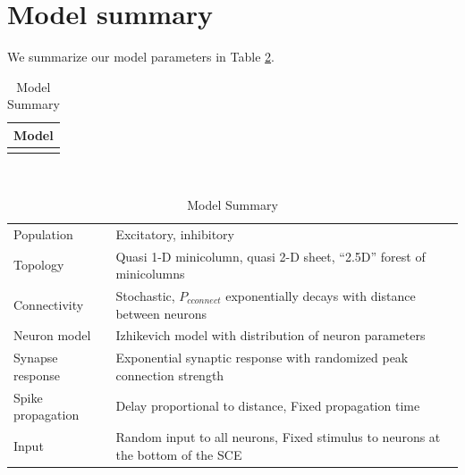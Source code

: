 \section{Model summary}
We summarize our model parameters in Table \ref{tab:all_params}. 
\begin{table}[!htb]
 \caption{Model Summary}
 \label{tab:all_params}
 \centering
 \begin{tabular}{c}
  \textbf{Model} \\
  \hline \\
 \end{tabular} \\
 \begin{tabular}{ll}
  Population & Excitatory, inhibitory \\
  Topology & Quasi 1-D minicolumn, quasi 2-D sheet, ``2.5D'' forest of minicolumns \\
  Connectivity & Stochastic, $P_{cconnect}$ exponentially decays with distance between neurons \\
  Neuron model & Izhikevich model with distribution of neuron parameters \\
  Synapse response & Exponential synaptic response with randomized peak connection strength  \\
  Spike propagation & Delay proportional to distance, Fixed propagation time \\
  Input & Random input to all neurons, Fixed stimulus to neurons at the bottom of the SCE \\
 \end{tabular}
\end{table}


\endinput
